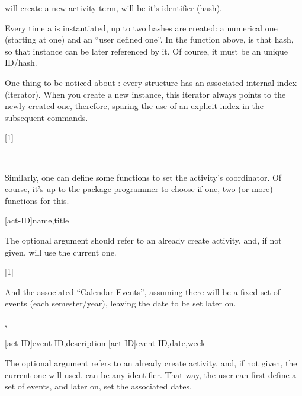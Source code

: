 \documentclass[10pt]{article}
\begin{document}
\begin{codedescribe}{\NewActivity}
\begin{codesyntax}
\end{codesyntax}
\tsobj{\NewActivity} will create a new activity term,  will be it's identifier (hash).

\end{codedescribe}
\begin{tsremark}
  Every time a  is instantiated, up to two hashes are created: a numerical one (starting at one) and an ``user defined one''. In the \tsobj{\NewActivity} function above,  is that hash, so that instance can be later referenced by it. Of course, it must be an unique ID/hash.
\end{tsremark}
\begin{tsremark}
  One thing to be noticed about : every structure has an associated internal index (iterator). When you create a new instance, this iterator always points to the newly created one, therefore, sparing the use of an explicit index in the subsequent commands.
\end{tsremark}

[1]

~

Similarly, one can define some functions to set the activity's coordinator. Of course, it's up to the package programmer to choose if one, two (or more) functions for this.

\begin{codedescribe}{\ActivitySetCoord}
\begin{codesyntax}
  \tsmacro{\ActivitySetCoord}[act-ID]{name,title}
\end{codesyntax}
The optional argument  should refer to an already create activity, and, if not given, will use the current one.
\end{codedescribe}

[1]


And the associated ``Calendar Events'', assuming there will be a fixed set of events (each semester/year), leaving the date to be set later on. 

\begin{codedescribe}{\ActivitySetNewEvent,\ActivitySetEventDay}
\begin{codesyntax}
  \tsmacro{\ActivitySetNewEvent}[act-ID]{event-ID,description}
  \tsmacro{\ActivitySetEventDay}[act-ID]{event-ID,date,week}
\end{codesyntax}
The optional argument  refers to an already create activity, and, if not given, the current one will used.  can be any identifier. That way, the user can first define a set of events, and later on, set the associated dates.
\end{codedescribe}
\end{document}
